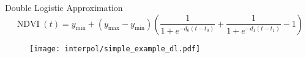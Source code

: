 
\begin{frame}[fragile]{Double Logistic Approximation}
            \begin{equation*}
                \operatorname{NDVI}(t) = y_{\min} + \left(y_{\max}-y_{\min}\right)\left(\frac{1}{1+e^{-d_0(t-t_0)}}+\frac{1}{1+e^{-d_1(t-t_1)}}-1\right)
            \end{equation*}
            \begin{figure}
                \centering
                \texttt{[image: interpol/simple\_example\_dl.pdf]}
            \end{figure}
\end{frame}





\newcommand{\RobItPlot}{fitted to different (SCL45) NDVI {TS}. Iterations of a robustifing refit (as indicated in section~\ref{sec:loess_robustify}) are also displayed.}




